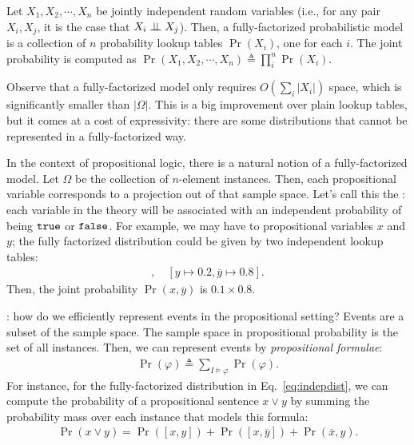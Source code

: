 \documentclass{tufte-handout}
\begin{document}
\begin{definition}
    Let $X_1, X_2, \cdots, X_n$ be jointly independent random variables (i.e.,
    for any pair $X_i, X_j$, it is the case that $X_i \perp \!\!\! \perp X_j$). Then, a
    fully-factorized probabilistic model is a collection of $n$ probability
    lookup tables $\Pr(X_i)$, one for each $i$. The joint probability is computed 
    as $\Pr(X_1, X_2, \cdots, X_n) \triangleq \prod_i^n \Pr(X_i)$.
\end{definition}

Observe that a fully-factorized model only requires $O(\sum_i |X_i|)$ space,
which is significantly smaller than $|\Omega|$. This is a big improvement
over plain lookup tables, but it comes at a cost of expressivity: there are some
distributions that cannot be represented in a fully-factorized way.

In the context of propositional logic, there is a natural notion of a
fully-factorized model. Let $\Omega$ be the collection of $n$-element instances.
Then, each propositional variable corresponds to a projection out of that sample
space. Let's call this the : each 
variable in the theory will be associated with an independent probability of 
being $\texttt{true}$ or $\texttt{false}$. For example, we may have to propositional variables $x$ and 
$y$; the fully factorized distribution could be given by two independent lookup tables:
\begin{align}
    [x \mapsto 0.1, \overline{x} \mapsto 0.9], \quad [y \mapsto 0.2, \overline{y} \mapsto 0.8].
    \label{eq:indepdist}
\end{align}
Then, the joint probability $\Pr(x, \overline{y})$ is $0.1 \times 0.8$.

: how do we efficiently represent 
events in the propositional setting? Events are a subset of the sample space. 
The sample space in propositional probability is the set of all instances. Then, 
we can represent events by \emph{propositional formulae}:
\begin{align}
    \Pr(\varphi) \triangleq \sum_{I \models \varphi} \Pr(\varphi).
\end{align}
For instance, for the fully-factorized 
distribution in Eq.~\ref{eq:indepdist}, we can compute the probability of a 
propositional sentence $x \lor y$ by summing the probability mass over each 
instance that models this formula:
\begin{align}
    \Pr(x \lor y) = \Pr([x, y]) + \Pr([x, \overline{y}]) + \Pr(\overline{x}, y).
\end{align}
\end{document}
